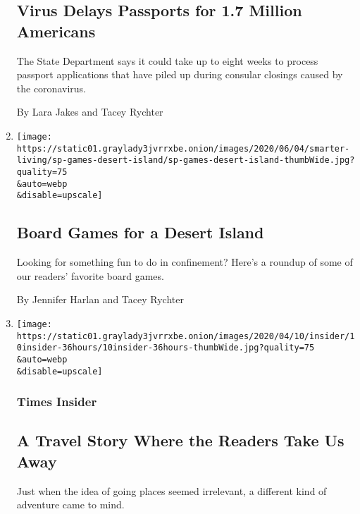 \begin{enumerate}
{  \subsection{Virus Delays Passports for 1.7 Million
  Americans}\label{virus-delays-passports-for-17-million-americans}}

  The State Department says it could take up to eight weeks to process
  passport applications that have piled up during consular closings
  caused by the coronavirus.

  By Lara Jakes and Tacey Rychter
\item
  \href{/2020/06/11/style/board-games-coronavirus-quarantine.html}{}

  \texttt{[image: https://static01.graylady3jvrrxbe.onion/images/2020/06/04/smarter-living/sp-games-desert-island/sp-games-desert-island-thumbWide.jpg?quality=75\\\&auto=webp\\\&disable=upscale]}

  \hypertarget{board-games-for-a-desert-island}{%
  \subsection{Board Games for a Desert
  Island}\label{board-games-for-a-desert-island}}

  Looking for something fun to do in confinement? Here's a roundup of
  some of our readers' favorite board games.

  By Jennifer Harlan and Tacey Rychter
\item
  \href{/2020/04/10/reader-center/reporter-travel-36hours.html}{}

  \texttt{[image: https://static01.graylady3jvrrxbe.onion/images/2020/04/10/insider/10insider-36hours/10insider-36hours-thumbWide.jpg?quality=75\\\&auto=webp\\\&disable=upscale]}

  \hypertarget{times-insider}{%
  \subsubsection{Times Insider}\label{times-insider}}

  \hypertarget{a-travel-story-where-the-readers-take-us-away}{%
  \subsection{A Travel Story Where the Readers Take Us
  Away}\label{a-travel-story-where-the-readers-take-us-away}}

  Just when the idea of going places seemed irrelevant, a different kind
  of adventure came to mind.


\end{enumerate}

